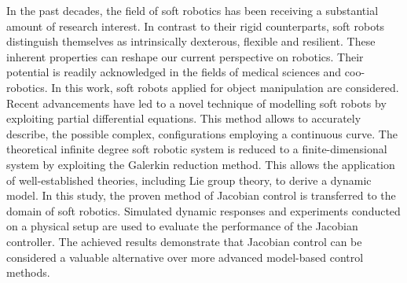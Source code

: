 In the past decades, the field of soft robotics has been receiving a substantial amount of research interest. In contrast to their rigid counterparts, soft robots distinguish themselves as intrinsically dexterous, flexible and resilient. These inherent properties can reshape our current perspective on robotics. Their potential is readily acknowledged in the fields of medical sciences and coo-robotics. In this work, soft robots applied for object manipulation are considered. Recent advancements have led to a novel technique of modelling soft robots by exploiting partial differential equations. This method allows to accurately describe, the possible complex, configurations employing a continuous curve. The theoretical infinite degree soft robotic system is reduced to a finite-dimensional system by exploiting the Galerkin reduction method. This allows the application of well-established theories, including Lie group theory, to derive a dynamic model. In this study, the proven method of Jacobian control is transferred to the domain of soft robotics. Simulated dynamic responses and experiments conducted on a physical setup are used to evaluate the performance of the Jacobian controller. The achieved results demonstrate that Jacobian control can be considered a valuable alternative over more advanced model-based control methods.